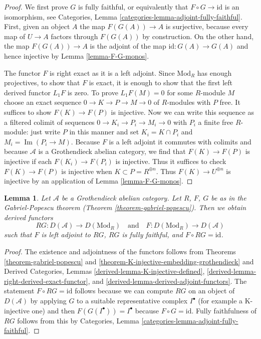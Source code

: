 \documentclass{stacks-project}
\newenvironment{reference}{\comment}{\endcomment}
\theoremstyle{plain}
\newtheorem{lemma}[subsection]{Lemma}
\theoremstyle{definition}
\theoremstyle{remark}
\numberwithin{equation}{subsection}
\def\Im{\mathop{\mathrm{Im}}}
\begin{document}
\begin{proof}
We first prove $G$ is fully faithful, or equivalently that
$F \circ G \to \text{id}$ is an isomorphism, see
Categories, Lemma \ref{categories-lemma-adjoint-fully-faithful}.
First, given an object $A$ the map $F(G(A)) \to A$ is surjective,
because every map of $U \to A$ factors through $F(G(A))$ by construction.
On the other hand, the map $F(G(A)) \to A$ is the adjoint of the
map $\text{id} : G(A) \to G(A)$ and hence injective by
Lemma \ref{lemma-F-G-monos}.

\medskip\noindent
The functor $F$ is right exact as it is a left adjoint.
Since $\text{Mod}_R$ has enough projectives, to show that
$F$ is exact, it is enough to show that the first left derived
functor $L_1F$ is zero. To prove $L_1F(M) = 0$ for some $R$-module $M$
choose an exact sequence $0 \to K \to P \to M \to 0$
of $R$-modules with $P$ free. It suffices to show $F(K) \to F(P)$
is injective. Now we can write this sequence as a filtered
colimit of sequences $0 \to K_i \to P_i \to M_i \to 0$
with $P_i$ a finite free $R$-module: just write $P$ in this
manner and set $K_i = K \cap P_i$ and $M_i = \Im(P_i \to M)$.
Because $F$ is a left adjoint it commutes
with colimits and because $\mathcal{A}$ is a Grothendieck
abelian category, we find that $F(K) \to F(P)$
is injective if each $F(K_i) \to F(P_i)$ is injective.
Thus it suffices to check $F(K) \to F(P)$
is injective when $K \subset P = R^{\oplus n}$.
Thus $F(K) \to U^{\oplus n}$ is injective by an application
of Lemma \ref{lemma-F-G-monos}.
\end{proof}

\begin{lemma}
\label{lemma-gabriel-popescu}
\begin{reference}
\cite[Corollary 4.1]{serpe}
\end{reference}
Let $\mathcal{A}$ be a Grothendieck abelian category. Let
$R$, $F$, $G$ be as in the Gabriel-Popescu theorem
(Theorem \ref{theorem-gabriel-popescu}). Then we obtain
derived functors
$$
RG : D(\mathcal{A}) \to D(\text{Mod}_R)
\quad\text{and}\quad
F : D(\text{Mod}_R) \to D(\mathcal{A})
$$
such that $F$ is left adjoint to $RG$, $RG$ is fully faithful,
and $F \circ RG = \text{id}$.
\end{lemma}

\begin{proof}
The existence and adjointness of the functors follows from
Theorems \ref{theorem-gabriel-popescu} and
\ref{theorem-K-injective-embedding-grothendieck}
and
Derived Categories, Lemmas \ref{derived-lemma-K-injective-defined},
\ref{derived-lemma-right-derived-exact-functor}, and
\ref{derived-lemma-derived-adjoint-functors}.
The statement $F \circ RG = \text{id}$ follows because we can
compute $RG$ on an object of $D(\mathcal{A})$ by applying $G$
to a suitable representative complex $I^\bullet$ (for example
a K-injective one) and then $F(G(I^\bullet)) = I^\bullet$
because $F \circ G = \text{id}$. Fully faithfulness of $RG$
follows from this by
Categories, Lemma \ref{categories-lemma-adjoint-fully-faithful}.
\end{proof}
\end{document}
